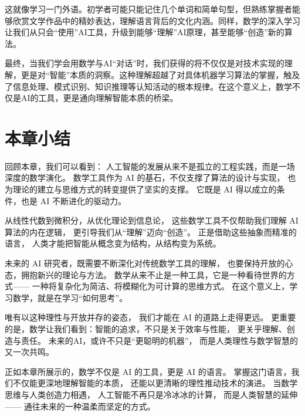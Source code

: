 这就像学习一门外语。初学者可能只能记住几个单词和简单句型，但熟练掌握者能够欣赏文学作品中的精妙表达，理解语言背后的文化内涵。同样，数学的深入学习让我们从只会“使用”AI工具，升级到能够“理解”AI原理，甚至能够“创造”新的算法。

最终，当我们学会用数学与AI“对话”时，我们获得的将不仅仅是对技术实现的理解，更是对“智能”本质的洞察。这种理解超越了对具体机器学习算法的掌握，触及了信息处理、模式识别、知识推理等认知活动的根本规律。在这个意义上，数学不仅是AI的工具，更是通向理解智能本质的桥梁。

\section{本章小结}

回顾本章，我们可以看到：  
人工智能的发展从来不是孤立的工程实践，而是一场深度的数学演化。  
数学工具作为 AI 的基石，不仅支撑了算法的设计与实现，  
也为理论的建立与思维方式的转变提供了坚实的支撑。  
它既是 AI 得以成立的条件，也是 AI 不断进化的驱动力。

从线性代数到微积分，从优化理论到信息论，  
这些数学工具不仅帮助我们理解 AI 算法的内在逻辑，  
更引导我们从“理解”迈向“创造”。  
正是借助这些抽象而精准的语言，  
人类才能把智能从概念变为结构，从结构变为系统。

未来的  AI  研究者，既需要不断深化对传统数学工具的理解，  
也要保持开放的心态，拥抱新兴的理论与方法。  
数学从来不止是一种工具，它是一种看待世界的方式——  
一种将复杂化为简洁、将模糊化为可计算的思维方式。  
在这个意义上，学习数学，就是在学习“如何思考”。

唯有以这种理性与开放并存的姿态，  
我们才能在 AI 的道路上走得更远。  
更重要的是，数学让我们看到：智能的追求，不只是关于效率与性能，  
更关乎理解、创造与责任。  
未来的AI，或许不只是“更聪明的机器”，  
而是人类理性与数学智慧的又一次共鸣。

正如本章所展示的，数学不仅是 AI 的工具，更是 AI 的语言。  
掌握这门语言，我们不仅能更深地理解智能的本质，  
还能以更清晰的理性推动技术的演进。  
当数学思维与人类创造力相遇，  
人工智能不再只是冷冰冰的计算，  
而是人类智慧的延伸——  
通往未来的一种温柔而坚定的方式。

\nocite{*}
